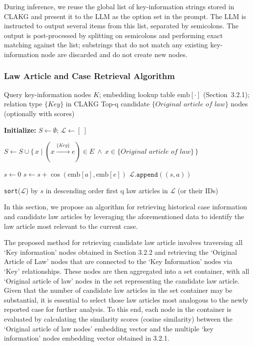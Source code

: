 \documentclass[review,times,nonatbib]{elsarticle} %
\renewcommand{\textcolor}[2]{#2}
\begin{document}
\textcolor{blue}{During inference, we reuse the global list of key-information strings stored in CLAKG and present it to the LLM as the option set in the prompt. The LLM is instructed to output several items from this list, separated by semicolons. The output is post-processed by splitting on semicolons and performing exact matching against the list; substrings that do not match any existing key-information node are discarded and do not create new nodes.}


\subsubsection{Law Article and Case Retrieval Algorithm}
\label{subsec323}
\begin{algorithm*}[h!]
\caption{Candidate Law Article Retrieval Algorithm}
\label{algorithm1}
\begin{algorithmic}[1]
\Require Query key-information nodes $K$; embedding lookup table $\mathrm{emb}[\cdot]$ (Section~3.2.1); relation type $\{\textit{Key}\}$ in CLAKG
\Ensure Top-q candidate $\{\textit{Original article of law}\}$ nodes (optionally with scores)

\State \textbf{Initialize:} $S \gets \emptyset$; $\mathcal{L} \gets [\ ]$ 

    \State $S \gets S \cup \{\, x \mid (x \xrightarrow{\{\textit{Key}\}} e) \in E \ \wedge\ x \in \{\textit{Original article of law}\} \,\}$
\EndFor

    \State $s \gets 0$
        \State $s \gets s + \cos(\mathrm{emb}[a], \mathrm{emb}[e])$
    \EndFor
    \State $\mathcal{L}.\texttt{append}((s, a))$
\EndFor

\State \texttt{sort}($\mathcal{L}$) by $s$ in descending order
\State \Return first q law articles in $\mathcal{L}$ (or their IDs)
\end{algorithmic}
\end{algorithm*}

In this section, we propose an algorithm for retrieving historical case information and candidate law articles by leveraging the aforementioned data to identify the law article most relevant to the current case. 

The proposed method for retrieving candidate law article involves traversing all `Key information’ nodes obtained in Section 3.2.2 and retrieving the `Original Article of Law' nodes that are connected to the `Key Information’ nodes via `Key’ relationships. These nodes are then aggregated into a set container, with all `Original article of law' nodes in the set representing the candidate law article. Given that the number of candidate law articles in the set container may be substantial, it is essential to select those law articles most analogous to the newly reported case for further analysis. To this end, each node in the container is evaluated by calculating the similarity scores (cosine similarity) between the `Original article of law nodes’ embedding vector and the multiple `key information’ nodes embedding vector obtained in 3.2.1. 
\end{document}
